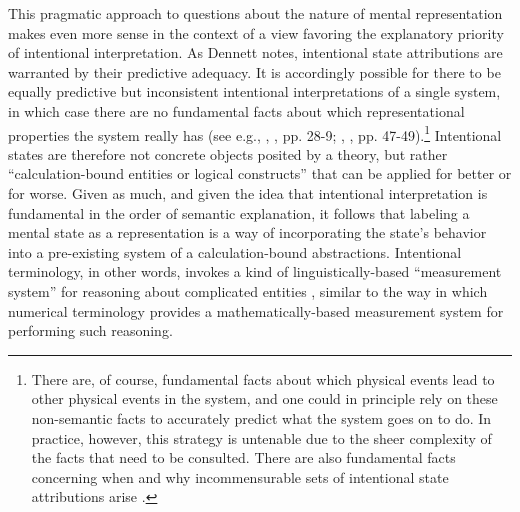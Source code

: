 This pragmatic approach to questions about the nature of mental representation makes even more sense in the context of a view favoring the explanatory priority of intentional interpretation. As Dennett \citep{Dennett:1987,Dennett:1991} notes, intentional state attributions are warranted by their predictive adequacy. It is accordingly possible for there to be equally predictive but inconsistent intentional interpretations of a single system, in which case there are no fundamental facts about which representational properties the system really has (see e.g., \citeauthor{Dennett:1987}, \citeyear{Dennett:1987}, pp. 28-9; \citeauthor{Dennett:1991}, \citeyear{Dennett:1991}, pp. 47-49).\footnote{There are, of course, fundamental facts about which physical events lead to other physical events in the system, and one could in principle rely on these non-semantic facts to accurately predict what the system goes on to do. In practice, however, this strategy is untenable due to the sheer complexity of the facts that need to be consulted. There are also fundamental facts concerning when and why incommensurable sets of intentional state attributions arise \citep{Dennett:1987}.} Intentional states are therefore not concrete objects posited by a theory, but rather ``calculation-bound entities or logical constructs'' \citep[][p. 53]{Dennett:1987} that can be applied for better or for worse. Given as much, and given the idea that intentional interpretation is fundamental in the order of semantic explanation, it follows that labeling a mental state as a representation is a way of incorporating the state's behavior into a pre-existing system of a calculation-bound abstractions. Intentional terminology, in other words, invokes a kind of linguistically-based ``measurement system'' for reasoning about complicated entities \citep[][p. 306]{Brandom:2010b}, similar to the way in which numerical terminology provides a mathematically-based measurement system for performing such reasoning.


